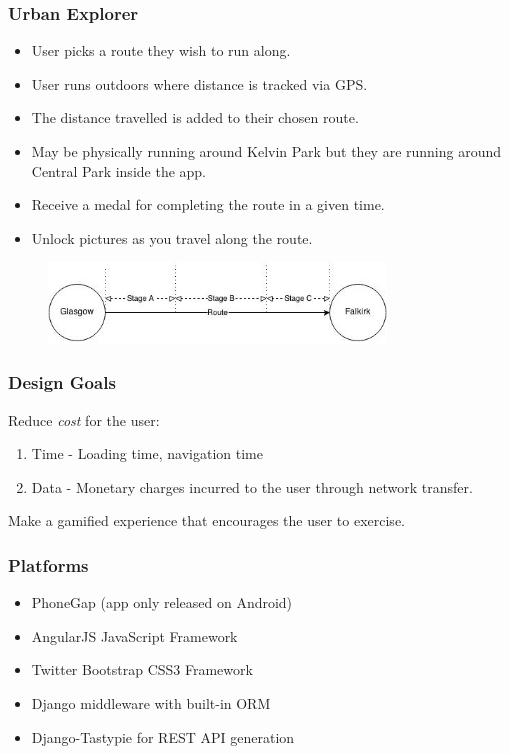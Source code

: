\documentclass{beamer}
\begin{document}
\begin{frame}
  \frametitle{Urban Explorer}
  \begin{itemize}
    \item User picks a route they wish to run along.
    \item User runs outdoors where distance is tracked via GPS.
    \item The distance travelled is added to their chosen route.
    \item May be physically running around Kelvin Park but they are
      running around Central Park inside the app.
    \item Receive a medal for completing the route in a given time.
    \item Unlock pictures as you travel along the route.
  \end{itemize}
  \begin{figure}[h]
    \centering
    \includegraphics[width=0.8\textwidth]{images/route_breakdown.jpg}
  \end{figure}
\end{frame}

\begin{frame}
  \frametitle{Design Goals}
  Reduce \emph{cost} for the user:
  \begin{enumerate}
    \item Time - Loading time, navigation time
    \item Data - Monetary charges incurred to the user through network
      transfer.
  \end{enumerate}
  
  Make a gamified experience that encourages the user to exercise.
\end{frame}

\begin{frame}
  \frametitle{Platforms}
  \begin{itemize}
    \item PhoneGap (app only released on Android)
    \item AngularJS JavaScript Framework
    \item Twitter Bootstrap CSS3 Framework
    \item Django middleware with built-in ORM
    \item Django-Tastypie for REST API generation
  \end{itemize}
\end{frame}
\end{document}
